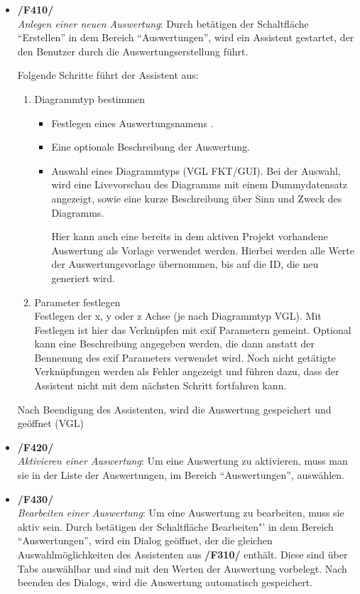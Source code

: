 	\begin{itemize}
		
		\item \textbf{/F410/}\\ \textit{Anlegen einer neuen Auswertung}: Durch betätigen der Schaltfläche "`Erstellen"' in dem Bereich "`Auswertungen"', wird ein Assistent gestartet, der den Benutzer durch die Auswertungserstellung führt.\par Folgende Schritte führt der Assistent aus:
			\begin{enumerate}
				\item Diagrammtyp bestimmen
					\begin{itemize}
						\item Festlegen eines Auswertungsnamens .
						\item Eine optionale Beschreibung der Auswertung.
						\item Auswahl eines Diagrammtyps (VGL FKT/GUI). Bei der Auswahl, wird eine Livevorschau des Diagramms mit einem Dummydatensatz angezeigt, sowie eine kurze Beschreibung über Sinn und Zweck des Diagramms.\par Hier kann auch eine bereits in dem aktiven Projekt vorhandene Auswertung als Vorlage verwendet werden. Hierbei werden alle Werte der Auswertungsvorlage übernommen, bis auf die ID, die neu generiert wird.
					\end{itemize}
				\item Parameter festlegen\\	Festlegen der x, y oder z Achse (je nach Diagrammtyp VGL). Mit Festlegen ist hier das Verknüpfen mit \gls{exif} Parametern gemeint. Optional kann eine Beschreibung angegeben werden, die dann anstatt der Bennenung des \gls{exif} Parameters verwendet wird. Noch nicht getätigte Verknüpfungen werden als Fehler angezeigt und führen dazu, dass der Assistent nicht mit dem nächsten Schritt fortfahren kann.
			\end{enumerate}
			Nach Beendigung des Assistenten, wird die Auswertung gespeichert und geöffnet (VGL)
		
		\item \textbf{/F420/}\\ \textit{Aktivieren einer Auswertung}: Um eine Auswertung zu aktivieren, muss man sie in der Liste der Auswertungen, im Bereich "`Auswertungen"', auswählen.
		
		\item \textbf{/F430/}\\ \textit{Bearbeiten einer Auswertung}: Um eine Auswertung zu bearbeiten, muss sie aktiv sein. Durch betätigen der Schaltfläche Bearbeiten"' in dem Bereich "`Auswertungen"', wird ein Dialog geöffnet, der die gleichen Auswahlmöglichkeiten des Assistenten aus \textbf{/F310/} enthält. Diese sind über Tabs auswählbar und sind mit den Werten der Auswertung vorbelegt. Nach beenden des Dialogs, wird die Auswertung automatisch gespeichert.
				

\end{itemize}
